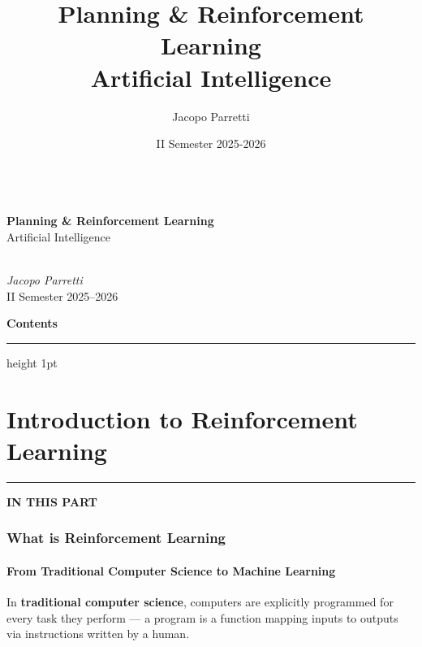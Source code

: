 \documentclass[11pt,a4paper]{article}
\title{\textbf{Planning \& Reinforcement Learning}\\
\large Artificial Intelligence}
\author{Jacopo Parretti}
\date{II Semester 2025-2026}
\theoremstyle{definition}
\theoremstyle{plain}
\theoremstyle{remark}
\newcommand{\partmtoc}{%
  \vspace{2pt}%
  {\color{rlrule}\rule{\linewidth}{0.5pt}}\par\vspace{3pt}%
  {\footnotesize\bfseries\color{rlaccent}IN THIS PART}\par\vspace{2pt}%
  \begingroup
  \etocsetnexttocdepth{subsection}%
  \localtableofcontents
  \endgroup
  \vspace{2pt}{\color{rlrule}\rule{\linewidth}{0.5pt}}\par\vspace{10pt}}
\begin{document}
\begin{titlepage}
\centering
\thispagestyle{empty}
\vspace*{\fill}
\\[0.9cm]
{\fontsize{40}{46}\selectfont\bfseries\color{rlprimary} Planning \&{} Reinforcement Learning}\\[0.55cm]
{\LARGE\color{rlaccent} Artificial Intelligence}\\[0.7cm]
\\[1.4cm]
{\Large\itshape Jacopo Parretti}\\[0.5cm]
{\large\color{rlprimary} II Semester 2025--2026}
\vspace*{\fill}
\end{titlepage}

\thispagestyle{empty}
\begingroup
\color{rlprimary}
\begin{center}{\Huge\bfseries\color{rlprimary} Contents}\end{center}
\vspace{0.4cm}
\endgroup
{\color{rlrule}\hrule height 1pt}\vspace{0.5cm}
\etocsettocstyle{}{}
\tableofcontents
\clearpage


\part{Introduction to Reinforcement Learning}
\partmtoc

\section{What is Reinforcement Learning}

\subsection{From Traditional Computer Science to Machine Learning}

In \textbf{traditional computer science}, computers are explicitly programmed for every task they perform — a program is a function mapping inputs to outputs via instructions written by a human.
\end{document}
